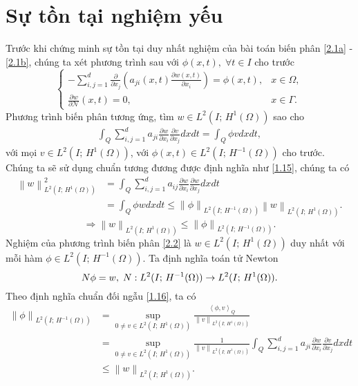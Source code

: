 \documentclass[]{article}
\begin{document}
\section{Sự tồn tại nghiệm yếu}
\qquad Trước khi chứng minh sự tồn tại duy nhất nghiệm của bài toán biến phân \eqref{2.1a} - \eqref{2.1b}, chúng ta xét phương trình sau với $\phi(x, t), \; \forall t \in I$ cho trước
$$\begin{cases}
	-\sum_{i, j=1}^{d}\frac{\partial }{\partial x_j}\left(a_{ji}(x, t)\frac{\partial w(x, t)}{\partial x_i}\right)=\phi(x, t), & x \in \Omega,\\
	\frac{\partial w}{\partial \mathcal{N}}(x, t)=0, &x\in \Gamma.
\end{cases}$$
Phương trình biến phân tương ứng, tìm $w\in L^2(I;\, H^1(\Omega))$ sao cho
\begin{align}\label{2.2}
	\int_{Q}\sum_{i, j=1}^{d}a_{ji}\frac{\partial w}{\partial x_i}\frac{\partial v}{\partial x_j}dxdt=\int_{Q}\phi vdxdt,
\end{align}
với mọi $v\in L^2\left(I;\, H^1(\Omega)\right)$, với $\phi(x, t)\in L^2(I;\, H^{-1}(\Omega))$ cho trước. 
\\
Chúng ta sẽ sử dụng chuẩn tương đương được định nghĩa như \eqref{1.15}, chúng ta có 
\begin{align*}
	\left\|w\right\|_{L^2(I;\, H^1(\Omega))}^2&=\int_{Q}\sum_{i, j=1}^{d}a_{ij}\frac{\partial w}{\partial x_i}\frac{\partial w}{\partial x_j}dxdt\\
	&=\int_{Q}\phi wdxdt\leq \left\|\phi\right\|_{L^2(I;\, H^{-1}(\Omega))}\left\|w\right\|_{L^2(I;\, H^1(\Omega))}. 
\end{align*}
$$\Rightarrow\left\|w\right\|_{L^2(I;\, H^1(\Omega))}\leq \left\|\phi\right\|_{L^2(I;\, H^{-1}(\Omega))}.$$
Nghiệm của phương trình biến phân \eqref{2.2} là $w\in L^2(I;\, H^1(\Omega))$ duy nhất với mỗi hàm $\phi\in L^2(I;\, H^{-1}(\Omega))$. Ta định nghĩa toán tử Newton
$$\mathnormal{N}\phi=w,\;\mathnormal{N}: L^2(I;\, H^{-1}(\Omega))\to L^2(I;\, H^1(\Omega)).$$
Theo định nghĩa chuẩn đối ngẫu \eqref{1.16}, ta có
\begin{align*}
	\left\|\phi\right\|_{L^2(I;\, H^{-1}(\Omega))}&=\sup_{0\neq v\in L^2(I;\, H^1(\Omega))}\frac{\left\langle\phi, v\right\rangle_{Q}}{\left\|v\right\|_{L^2(I;\, H^1(\Omega))}}\\
	&=\sup_{0\neq v\in L^2(I;\, H^1(\Omega))}\frac{1}{\left\|v\right\|_{L^2(I;\, H^1(\Omega))}}\int_{Q}\sum_{i, j=1}^{d}a_{ji}\frac{\partial w}{\partial x_i}\frac{\partial v}{\partial x_j}dxdt\\
	&\leq \left\|w\right\|_{L^2(I;\, H^1(\Omega))}.
\end{align*}
\end{document}
